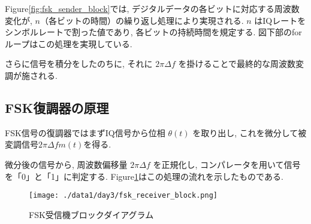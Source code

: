 \documentclass[a4paper, twocolumn]{article} %
\begin{document}
Figure\ref{fig:fsk_sender_block}では, デジタルデータの各ビットに対応する周波数変化が, \(n\)（各ビットの時間）の繰り返し処理により実現される. \(n\) はIQレートをシンボルレートで割った値であり, 各ビットの持続時間を規定する. 図下部のforループはこの処理を実現している.

さらに信号を積分をしたのちに, それに \(2\pi\Delta f\) を掛けることで最終的な周波数変調が施される.

\subsection{FSK復調器の原理}
FSK信号の復調器ではまずIQ信号から位相 \(\theta(t)\) を取り出し, これを微分して被変調信号\(2\pi \Delta f m(t)\)を得る. 

微分後の信号から, 周波数偏移量 \(2\pi\Delta f\) を正規化し, コンパレータを用いて信号を「0」と「1」に判定する. Figure\ref{fig:fsk_receiver_block}はこの処理の流れを示したものである.

\begin{figure}[H]
    \centering
    \texttt{[image: ./data1/day3/fsk\_receiver\_block.png]}
    \caption{FSK受信機ブロックダイアグラム}
    \label{fig:fsk_receiver_block}
\end{figure}
\end{document}
